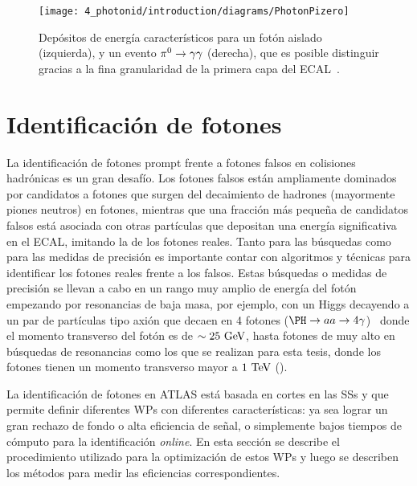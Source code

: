 \begin{figure}[ht!]
    \centering
    \texttt{[image: 4\_photonid/introduction/diagrams/PhotonPizero]}
    \caption{Depósitos de energía característicos para un fotón aislado (izquierda), y un evento \(\pi^{0}\rightarrow\gamma\gamma\) (derecha), que es posible distinguir gracias a la fina granularidad de la primera capa del \ac{ECAL}~\cite{ATLAS-ECAL-Pizero}.}
    \label{fig:pid_ss:ss:pizero}
\end{figure}






\section{Identificación de fotones}
\label{sec:pid_ss:pid}

La identificación de fotones prompt frente a fotones falsos en colisiones hadrónicas es un gran desafío. Los fotones falsos están ampliamente dominados por candidatos a fotones que surgen del decaimiento de hadrones (mayormente piones neutros) en fotones, mientras que una fracción más pequeña de candidatos falsos está asociada con otras partículas que depositan una energía significativa en el \ac{ECAL}, imitando la de los fotones reales.
Tanto para las búsquedas como para las medidas de precisión es importante contar con algoritmos y técnicas para identificar los fotones reales frente a los falsos. Estas búsquedas o medidas de precisión se llevan a cabo en un rango muy amplio de energía del fotón empezando por resonancias de baja masa, por ejemplo, con un Higgs decayendo a un par de partículas tipo axión que decaen en 4 fotones (\(\PH\to aa \to 4\gamma\))~\cite{ATLAS-HiggsTo4Gamma} donde el momento transverso del fotón es de \(\sim 25~\text{GeV}\), hasta fotones de muy alto \pt en búsquedas de resonancias \gammajet como los que se realizan para esta tesis, donde los fotones tienen un momento transverso mayor a \(1~\text{TeV}\) (\Part{\ref{part:search}}).

La identificación de fotones en \ac{ATLAS} está basada en cortes en las \acp{SS} y que permite definir diferentes \acfp{WP} con diferentes características: ya sea lograr un gran rechazo de fondo o alta eficiencia de señal, o simplemente bajos tiempos de cómputo para la identificación \textit{online}. En esta sección se describe el procedimiento utilizado para la optimización de estos \acp{WP} y luego se describen los métodos para medir las eficiencias correspondientes.



